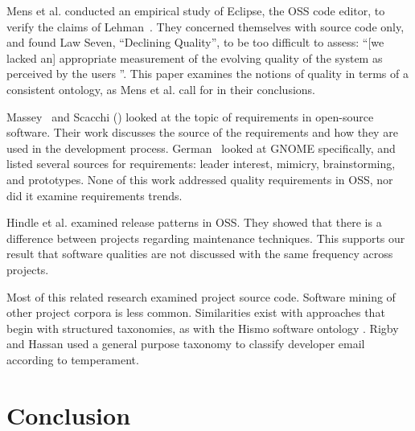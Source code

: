 \documentclass[10pt, conference, compsocconf]{IEEEtran}
\begin{document}

Mens et al. \cite{mens08icsm} conducted an empirical study of Eclipse, the OSS code editor, to verify the claims of Lehman~\cite{lehman97sms}. They concerned themselves with source code only, and found Law Seven, ``Declining Quality'', to be too difficult to assess: ``[we lacked an] appropriate measurement of the evolving quality of the system as perceived by the users \cite[p. 388]{mens08icsm}''. This paper examines the notions of quality in terms of a consistent ontology, as Mens et al. call for in their conclusions.

Massey~\cite{massey02icse} and Scacchi (\cite{scacchi02,scacchi05b}) looked at the topic of requirements in open-source software. Their work discusses the source of the requirements and how they are used in the development process. German~\cite{german03gnome} looked at GNOME specifically, and listed several sources for requirements: leader interest, mimicry, brainstorming, and prototypes. None of this work  addressed quality requirements in OSS, nor did it examine requirements trends.

Hindle et al. \cite{Hindle2007} examined release patterns in OSS. They showed that there is a difference between projects regarding maintenance techniques. This supports our result that software qualities are not discussed with the same frequency across projects.

Most of this related research examined project source code. Software mining of other project corpora is less common. Similarities exist with approaches that begin with structured taxonomies, as with the Hismo software ontology \cite{girba06}. Rigby and Hassan \cite{rigby07msr} used a general purpose taxonomy to classify developer email according to temperament.

\section{Conclusion}




\end{document}
